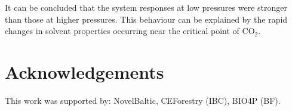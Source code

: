 \documentclass[a4paper,fleqn]{cas-dc}
\begin{document}
	It can be concluded that the system responses at low pressures were stronger than those at higher pressures. This behaviour can be explained by the rapid changes in solvent properties occurring near the critical point of CO$_2$.
	
	\section*{Acknowledgements} 
	This work was supported by: NovelBaltic, CEForestry (IBC), BIO4P (BF).
	
	
	
	
	\clearpage
	
\end{document}
